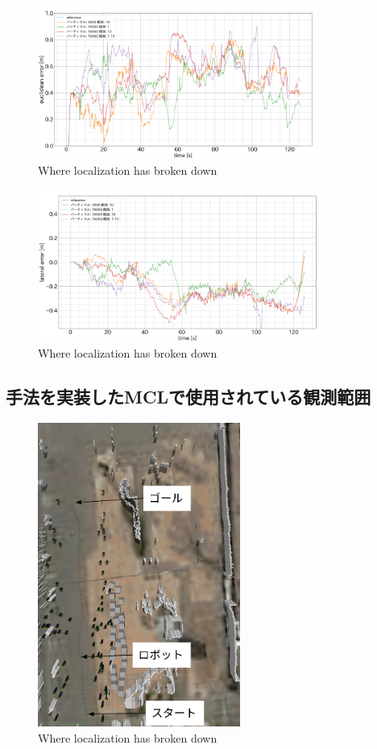 \documentclass{jarticle}
\begin{document}
\begin{figure}[htbp]
  \centering
   \includegraphics[height=50mm]{fig/euclidean_error.png}
   \vspace*{-4mm}
   \caption{Where localization has broken down}
   \label{fig: 失敗箇所}
\end{figure}

\begin{figure}[htbp]
  \centering
   \includegraphics[height=50mm]{fig/lateral_error.png}
   \vspace*{-4mm}
   \caption{Where localization has broken down}
   \label{fig: 失敗箇所}
\end{figure}

\subsection{手法を実装したMCLで使用されている観測範囲}

\begin{figure}[htbp]
  \centering
   \includegraphics[height=100mm]{fig/particle_1000_observation_1_mcl_gazebo.png}
   \vspace*{-4mm}
   \caption{Where localization has broken down}
   \label{fig: 失敗箇所}
\end{figure}
\end{document}

